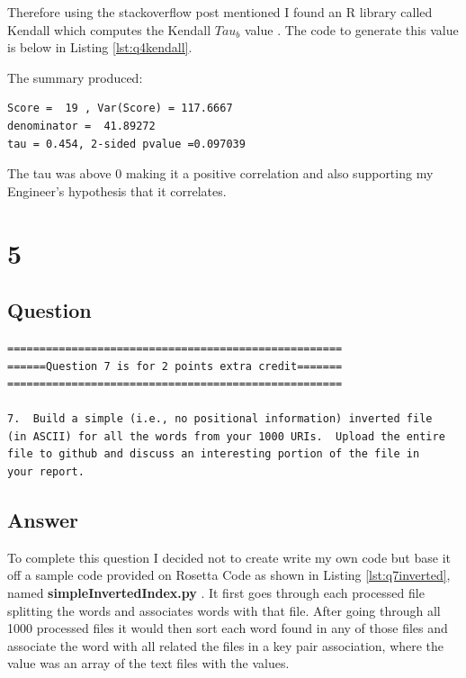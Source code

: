 \documentclass[letterpaper,11pt]{article}
\newcommand*{\srcPath}{../src}%
\begin{document}
Therefore using the stackoverflow post mentioned I found an R library called Kendall which computes the Kendall $Tau_b$ value \cite{stackoverflowpostref}. The code to generate this value is below in Listing \ref{lst:q4kendall}.



The summary produced:
\begin{verbatim}
Score =  19 , Var(Score) = 117.6667
denominator =  41.89272
tau = 0.454, 2-sided pvalue =0.097039
\end{verbatim}

The tau was above 0 making it a positive correlation and also supporting my Engineer's hypothesis that it correlates.


\clearpage
\section*{5}

\subsection*{Question}

\begin{verbatim}
====================================================
======Question 7 is for 2 points extra credit=======
====================================================

7.  Build a simple (i.e., no positional information) inverted file
(in ASCII) for all the words from your 1000 URIs.  Upload the entire
file to github and discuss an interesting portion of the file in
your report.
\end{verbatim}

\clearpage
\subsection*{Answer}

To complete this question I decided not to create write my own code but base it off a sample code provided on Rosetta Code as shown in Listing \ref{lst:q7inverted}, named \textbf{simpleInvertedIndex.py} \cite{invertedindexref}. It first goes through each processed file splitting the words and associates words with that file. After going through all 1000 processed files it would then sort each word found in any of those files and associate the word with all related the files in a key pair association, where the value was an array of the text files with the values.
\end{document}

